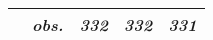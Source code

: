 \begin{table}[H]
\begin{centering}
\begin{tabular}{ r c ccc}
	 & \textit{obs.}	 & \textit{332}	 & \textit{332}	 & \textit{331}	\\
\hline
\end{tabular}
\par\end{centering}
\end{table}					
